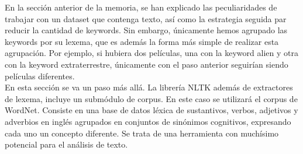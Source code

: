 En la sección anterior de la memoria, se han explicado las peculiaridades de trabajar con un dataset que contenga texto, así como la estrategia seguida par reducir la cantidad de keywords. Sin embargo, únicamente hemos agrupado las keywords por su lexema, que es además la forma más simple de realizar esta agrupación. Por ejemplo, si hubiera dos películas, una con la keyword alien y otra con la keyword extraterrestre, únicamente con el paso anterior seguirían siendo películas diferentes.\\

En esta sección se va un paso más allá. La librería NLTK además de extractores de lexema, incluye un submódulo de corpus. En este caso se utilizará el corpus de WordNet. Consiste en una base de datos léxica de sustantivos, verbos, adjetivos y adverbios en inglés agrupados en conjuntos de sinónimos cognitivos, expresando cada uno un concepto diferente. Se trata de una herramienta con muchísimo potencial para el análisis de texto.\\

